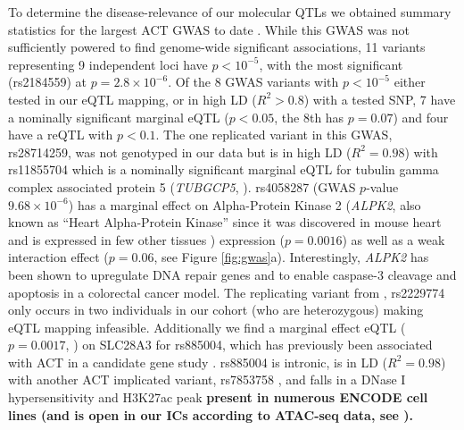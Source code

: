 \documentclass[9pt,lineno]{elife}
\newcommand{\tempbold}[1]{\textbf{#1}}
\begin{document}
To determine the disease-relevance of our molecular QTLs we obtained summary statistics for the largest ACT GWAS to date \citep{Schneider2016}. While this GWAS was not sufficiently powered to find genome-wide significant associations, 11 variants representing 9 independent loci have $p<10^{-5}$, with the most significant (rs2184559) at $p=2.8 \times 10^{-6}$. Of the 8 GWAS variants with $p<10^{-5}$ either tested in our eQTL mapping, or in high LD ($R^2 > 0.8$) with a tested SNP, 7 have a nominally significant marginal eQTL ($p<0.05$, the 8th has $p=0.07$) and four have a reQTL with $p<0.1$. The one replicated variant in this GWAS, rs28714259, was not genotyped in our data but is in high LD ($R^2=0.98$) with rs11855704 which is a nominally significant marginal eQTL for tubulin gamma complex associated protein 5 (\emph{TUBGCP5}, ). rs4058287 (GWAS $p$-value $9.68\times 10^{-6}$) has a marginal effect on Alpha-Protein Kinase 2 (\emph{ALPK2}, also known as ``Heart Alpha-Protein Kinase'' since it was discovered in mouse heart \citep{ryazanov1999alpha} and is expressed in few other tissues \citep{Mele2015-sc}) expression ($p=0.0016$) as well as a weak interaction effect ($p=0.06$, see Figure \ref{fig:gwas}a). Interestingly, \emph{ALPK2} has been shown to upregulate DNA repair genes and to enable caspase-3 cleavage and apoptosis in a colorectal cancer model\citep{yoshida2012alpk2}. The replicating variant from \cite{Aminkeng2015}, rs2229774 only occurs in two individuals in our cohort (who are heterozygous) making eQTL mapping infeasible. Additionally we find a marginal effect eQTL ($p=0.0017$, ) on SLC28A3 for rs885004, which has previously been associated with ACT in a candidate gene study \citep{Visscher2013-zs}. rs885004 is intronic, is in LD ($R^2=0.98$) with another ACT implicated variant, rs7853758 \citep{Visscher2012-xl}, and falls in a DNase I hypersensitivity and H3K27ac peak \tempbold{present in numerous ENCODE cell lines (and is open in our ICs according to ATAC-seq data, see \FIGSUPP[gwas]{rs885004}).}
\end{document}
